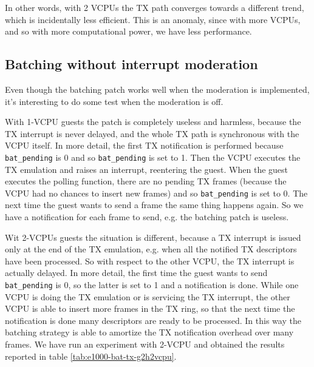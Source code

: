 \vspace{0.5cm}

In other words, with 2 VCPUs the TX path converges towards a different trend, which is incidentally less efficient. This is an anomaly,
since with more VCPUs, and so with more computational power, we have less performance.



\subsection{Batching without interrupt moderation}
Even though the batching patch works well when the moderation is implemented, it's interesting to do some test when the moderation is off.

\vspace{0.5cm}

With 1-VCPU guests the patch is completely useless and harmless, because the TX interrupt is never delayed, and the whole TX path is
synchronous with the VCPU itself. In more detail, the first TX notification is performed because \texttt{bat\_pending} is 0 and so
\texttt{bat\_pending} is set to 1. Then the VCPU executes the TX emulation and raises an interrupt, reentering the guest. When
the guest executes the polling function, there are no pending TX frames (because the VCPU had no chances to insert new frames) and so
\texttt{bat\_pending} is set to 0. The next time the guest wants to send a frame the same thing happens again. So we have a notification
for each frame to send, e.g. the batching patch is useless.

\vspace{0.5cm}

Wit 2-VCPUs guests the situation is different, because a TX interrupt is issued only at the end of the TX emulation, e.g. when all the
notified TX descriptors have been processed. So with respect to the other VCPU, the TX interrupt is actually delayed.
In more detail, the first time the guest wants to send \texttt{bat\_pending} is 0, so the latter is set to 1 and a notification is done.
While one VCPU is doing the TX emulation or is servicing the TX interrupt, the other VCPU is able to insert more frames in the TX ring,
so that the next time the notification is done many descriptors are ready to be processed. In this way the batching strategy is able
to amortize the TX notification overhead over many frames. We have run an experiment with 2-VCPU and obtained the results reported in
table \ref{tab:e1000-bat-tx-g2h2vcpu}.

